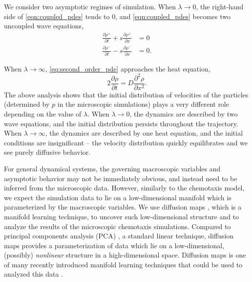 \documentclass[prl, reprint]{revtex4-1}
\begin{document}
We consider two asymptotic regimes of simulation.
%
When $\lambda \rightarrow 0$, the right-hand side of \eqref{eqn:coupled_pdes} tends to 0, and \eqref{eqn:coupled_pdes} becomes two uncoupled wave equations,
\begin{equation}
\begin{aligned}
\frac{\partial \rho^+}{\partial t} + s \frac{\partial \rho^+}{\partial x} & = 0 \\
\frac{\partial \rho^-}{\partial t} - s \frac{\partial \rho^-}{\partial x} & = 0.
\end{aligned}
\end{equation}

When $\lambda \rightarrow \infty$, \eqref{eq:second_order_pde} approaches the heat equation,
\begin{equation}
2 \frac{\partial \rho}{\partial t} = D \frac{\partial ^2 \rho}{\partial x^2}.
\end{equation}
%
%
The above analysis shows that the initial distribution of velocities of the particles (determined by $p$ in the microscopic simulations) plays a very different role depending on the value of $\lambda$.
%
When $\lambda \rightarrow 0$, the dynamics are described by two wave equations, and the initial distribution persists throughout the trajectory.
%
When $\lambda \rightarrow \infty$, the dynamics are described by one heat equation, and the initial conditions are insignificant -- the velocity distribution quickly equilibrates and we see purely diffusive behavior.

For general dynamical systems, the governing macroscopic variables and asymptotic behavior may not be immediately obvious, and instead need to be inferred from the microscopic data.
%
However, similarly to the chemotaxis model, we expect the simulation data to lie on a low-dimensional manifold which is parameterized by the macroscopic variables.
%
We use diffusion maps \cite{coifman2005geometric}, which is a manifold learning technique, to uncover such low-dimensional structure and to analyze the results of the microscopic chemotaxis simulations.
%
Compared to principal components analysis (PCA) \cite{shlens2005tutorial}, a standard linear technique, diffusion maps provides a parameterization of data which lie on a low-dimensional, (possibly) {\em nonlinear} structure in a high-dimensional space.
%
Diffusion maps is one of many recently introduced manifold learning techniques that could be used to analyzed this data \cite{roweis2000nonlinear, tenenbaum2000global, Belkin2003}.
\end{document}

